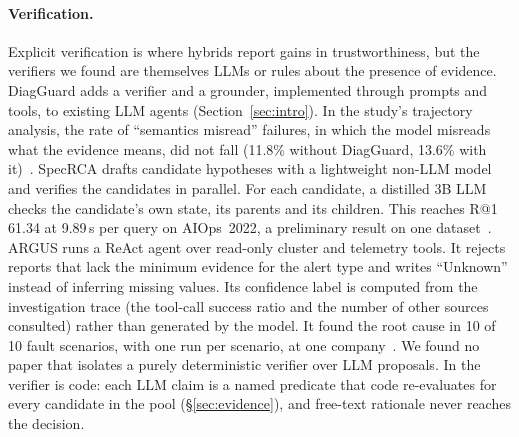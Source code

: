 \paragraph{Verification.}
Explicit verification is where hybrids report gains in trustworthiness, but the verifiers we found are themselves LLMs or rules about the presence of evidence.
DiagGuard adds a verifier and a grounder, implemented through prompts and tools, to existing LLM agents (Section~\ref{sec:intro}). In the study's trajectory analysis, the rate of ``semantics misread'' failures, in which the model misreads what the evidence means, did not fall (11.8\% without DiagGuard, 13.6\% with it)~\cite{diagguard2026}.
SpecRCA drafts candidate hypotheses with a lightweight non-LLM model and verifies the candidates in parallel. For each candidate, a distilled 3B LLM checks the candidate's own state, its parents and its children. This reaches R@1 61.34 at 9.89\,s per query on AIOps~2022, a preliminary result on one dataset~\cite{specrca2026}.
ARGUS runs a ReAct agent over read-only cluster and telemetry tools. It rejects reports that lack the minimum evidence for the alert type and writes ``Unknown'' instead of inferring missing values. Its confidence label is computed from the investigation trace (the tool-call success ratio and the number of other sources consulted) rather than generated by the model. It found the root cause in 10 of 10 fault scenarios, with one run per scenario, at one company~\cite{argus2026}.
We found no paper that isolates a purely deterministic verifier over LLM proposals.
In \sys the verifier is code: each LLM claim is a named predicate that code re-evaluates for every candidate in the pool (\S\ref{sec:evidence}), and free-text rationale never reaches the decision.

